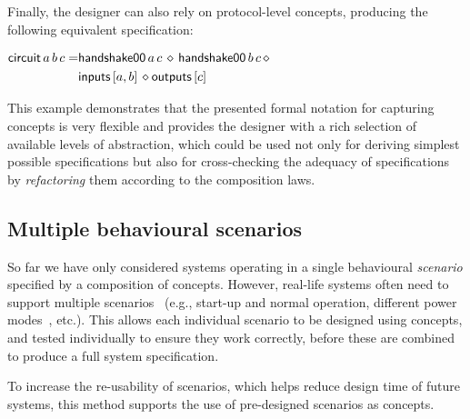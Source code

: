 \documentclass[british,compsoc]{IEEEtran}
\begin{document}
Finally, the designer can also rely on protocol-level concepts, producing
the following equivalent specification:


\begin{minipage}[t]{1\columnwidth}%

$\\\begin{aligned}\mathsf{circuit}\,a \,b \,c=&\mathsf{handshake00}\,a \,c \,\diamond\,\mathsf{handshake00}\,b \,c \, \diamond\\
&\mathsf{inputs}\,[a,b] \,\diamond \mathsf{outputs}\,[c]
\end{aligned}$\\
\end{minipage}


This example demonstrates that the presented formal notation for capturing
concepts is very flexible and provides the designer with a rich selection
of available levels of abstraction, which could be used not only for
deriving simplest possible specifications but also for cross-checking
the adequacy of specifications by \emph{refactoring} them according
to the composition laws.




\subsection{Multiple behavioural scenarios \label{sub:scenarios}}



So far we have only considered systems operating in a single behavioural
\textit{scenario} specified by a composition of concepts. However,
real-life systems often need to support multiple scenarios~ (e.g.,
start-up and normal operation, different power modes~\cite{microadapt},
etc.). This allows each individual scenario to be designed using concepts,
and tested individually to ensure they work correctly, before these
are combined to produce a full system specification.

To increase the re-usability of scenarios, which helps reduce design
time of future systems, this method supports the use of pre-designed
scenarios as concepts.
\end{document}
